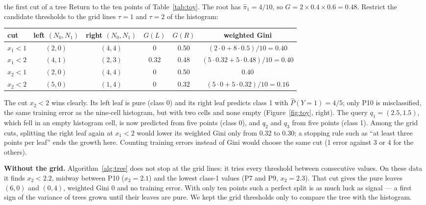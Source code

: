 \documentclass[11pt]{article}
\newcommand{\toy}[1]{\textsf{P#1}}%
\begin{document}
\begin{worked}{the first cut of a tree}
Return to the ten points of Table~\ref{tab:toy}. The root has $\hat\pi_1 = 4/10$, so $G = 2 \times 0.4 \times 0.6 =
0.48$. Restrict the candidate thresholds to the grid lines $\tau = 1$ and $\tau = 2$ of the histogram:

\begin{center}\small
\begin{tabular}{@{}lccccc@{}}\toprule
cut & left $(N_0, N_1)$ & right $(N_0, N_1)$ & $G(L)$ & $G(R)$ & weighted Gini \\ \midrule
$x_1 < 1$ & $(2, 0)$ & $(4, 4)$ & 0 & 0.50 & $(2 \cdot 0 + 8 \cdot 0.5)/10 = 0.40$ \\
$x_1 < 2$ & $(4, 1)$ & $(2, 3)$ & 0.32 & 0.48 & $(5 \cdot 0.32 + 5 \cdot 0.48)/10 = 0.40$ \\
$x_2 < 1$ & $(2, 0)$ & $(4, 4)$ & 0 & 0.50 & $0.40$ \\
$x_2 < 2$ & $(5, 0)$ & $(1, 4)$ & 0 & 0.32 & $(5 \cdot 0 + 5 \cdot 0.32)/10 = 0.16$ \\ \bottomrule
\end{tabular}
\end{center}
The cut $x_2 < 2$ wins clearly. Its left leaf is pure (class 0) and its right leaf predicts class 1 with
$\hat P(Y = 1) = 4/5$; only \toy{10} is misclassified, the same training error as the nine-cell histogram, but with two cells
and none empty (Figure~\ref{fig:toy}, right). The query $q_1 = (2.5, 1.5)$, which fell in an empty histogram cell,
is now predicted from five points (class 0), and $q_2$ and $q_3$ from five points (class 1). Among the grid cuts,
splitting the right leaf again at $x_1 < 2$ would lower its weighted Gini only from 0.32 to 0.30; a stopping rule such
as ``at least three points per leaf'' ends the growth here. Counting training errors instead of Gini would choose the
same cut (1 error against 3 or 4 for the others).

\textbf{Without the grid.} Algorithm~\ref{alg:tree} does not stop at the grid lines: it tries every threshold between
consecutive values. On these data it finds $x_2 < 2.2$, midway between \toy{10} ($x_2 = 2.1$) and the lowest class-1
values (\toy{7} and \toy{9}, $x_2 = 2.3$). That cut gives the pure leaves $(6, 0)$ and $(0, 4)$, weighted Gini 0 and no training error.
With only ten points such a perfect split is as much luck as signal --- a first sign of the variance of trees grown
until their leaves are pure. We kept the grid thresholds only to compare the tree with the histogram.
\end{worked}
\end{document}
